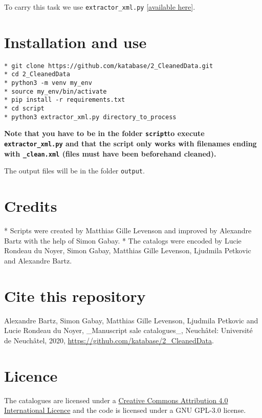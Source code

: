 To carry this task we use \texttt{extractor\_xml.py} \href{https://github.com/katabase/2\_CleanedData/tree/master/script/extractor-xml.py}{[available here}].
\section*{Installation and use}

\begin{listing}[h!]
   \begin{verbatim}
* git clone https://github.com/katabase/2_CleanedData.git
* cd 2_CleanedData
* python3 -m venv my_env
* source my_env/bin/activate
* pip install -r requirements.txt
* cd script 
* python3 extractor_xml.py directory_to_process

   \end{verbatim}
\end{listing}

\textbf{Note that you have to be in the folder \texttt{script}to execute \texttt{extractor\_xml.py} and that the script only works with filenames ending with \texttt{\_clean.xml} (files must have been beforehand cleaned).}

The output files will be in the folder \texttt{output}.
\section*{Credits}

* Scripts were created by Matthias Gille Levenson and improved by Alexandre Bartz with the help of Simon Gabay.
* The catalogs were encoded by Lucie Rondeau du Noyer, Simon Gabay, Matthias Gille Levenson, Ljudmila Petkovic and Alexandre Bartz.
\section*{Cite this repository}

Alexandre Bartz, Simon Gabay, Matthias Gille Levenson, Ljudmila Petkovic and Lucie Rondeau du Noyer, \_Manuscript sale catalogues\_, Neuchâtel: Université de Neuchâtel, 2020, \href{https://github.com/katabase/2\_CleanedData}{https://github.com/katabase/2\_CleanedData}.
\section*{Licence}

The catalogues are licensed under a \href{http://creativecommons.org/licenses/by/4.0/}{Creative Commons Attribution 4.0 International Licence} and the code is licensed under a GNU GPL-3.0 license.
